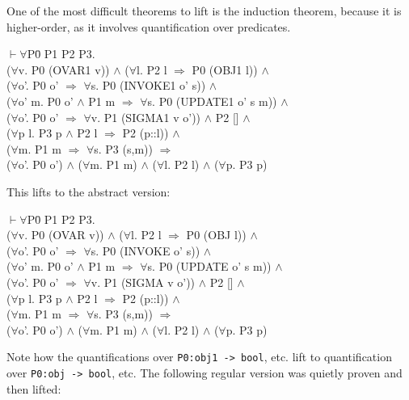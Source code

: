 \documentclass[envcountsame,runningheads]{llncs}
\begin{document}
One of the most difficult theorems to lift is the induction theorem,
because it is higher-order, as it involves quantification over predicates.
{\tt \begin{tabbing}
$\vdash \forall$P\=0 P1 P2 P3. \\
\>   ($\forall$v. P0 (OVAR1 v)) $\wedge$ ($\forall$l. P2 l $\Rightarrow$ P0 (OBJ1 l)) $\wedge$ \\
\>   ($\forall$o'. P0 o' $\Rightarrow$ $\forall$s. P0 (INVOKE1 o' s)) $\wedge$ \\
\>   ($\forall$o' m. P0 o' $\wedge$ P1 m $\Rightarrow$ $\forall$s. P0 (UPDATE1 o' s m)) $\wedge$ \\
\>   ($\forall$o'. P0 o' $\Rightarrow$ $\forall$v. P1 (SIGMA1 v o')) $\wedge$ P2 [] $\wedge$ \\
\>   ($\forall$p l. P3 p $\wedge$ P2 l $\Rightarrow$ P2 (p::l)) $\wedge$ \\
\>   ($\forall$m. P1 m $\Rightarrow$ $\forall$s. P3 (s,m)) $\Rightarrow$ \\
\>   ($\forall$o'. P0 o') $\wedge$ ($\forall$m. P1 m) $\wedge$ ($\forall$l. P2 l) $\wedge$ ($\forall$p. P3 p)
\end{tabbing}}
This lifts to the abstract version:
{\tt \begin{tabbing}
$\vdash \forall$P\=0 P1 P2 P3. \\
\>   ($\forall$v. P0 (OVAR v)) $\wedge$ ($\forall$l. P2 l $\Rightarrow$ P0 (OBJ l)) $\wedge$ \\
\>   ($\forall$o'. P0 o' $\Rightarrow$ $\forall$s. P0 (INVOKE o' s)) $\wedge$ \\
\>   ($\forall$o' m. P0 o' $\wedge$ P1 m $\Rightarrow$ $\forall$s. P0 (UPDATE o' s m)) $\wedge$ \\
\>   ($\forall$o'. P0 o' $\Rightarrow$ $\forall$v. P1 (SIGMA v o')) $\wedge$ P2 [] $\wedge$ \\
\>   ($\forall$p l. P3 p $\wedge$ P2 l $\Rightarrow$ P2 (p::l)) $\wedge$ \\
\>   ($\forall$m. P1 m $\Rightarrow$ $\forall$s. P3 (s,m)) $\Rightarrow$ \\
\>   ($\forall$o'. P0 o') $\wedge$ ($\forall$m. P1 m) $\wedge$ ($\forall$l. P2 l) $\wedge$ ($\forall$p. P3 p)
\end{tabbing}}
Note how the quantifications over {\tt P0:obj1 -> bool}, etc. lift to
quantification over {\tt P0:obj -> bool}, etc.
The following regular version was quietly proven and then lifted:
\end{document}
